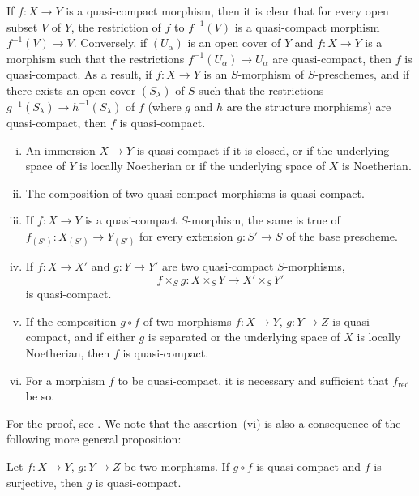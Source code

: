 If $f:X\to Y$ is a quasi-compact morphism, then it is clear that for every open subset $V$ of $Y$, the restriction of $f$ to $f^{-1}(V)$ is a quasi-compact morphism $f^{-1}(V)\to V$.
Conversely, if $(U_\alpha)$ is an open cover of $Y$ and $f:X\to Y$ is a morphism such that the restrictions $f^{-1}(U_\alpha)\to U_\alpha$ are quasi-compact, then $f$ is quasi-compact.
As
a result, if $f:X\to Y$ is an $S$-morphism of $S$-preschemes, and if there exists an open cover $(S_\lambda)$ of $S$ such that the restrictions $g^{-1}(S_\lambda)\to h^{-1}(S_\lambda)$ of $f$ (where $g$ and $h$ are the structure morphisms) are quasi-compact, then $f$ is quasi-compact.

\begin{proposition}[1.1.2]
\label{IV.1.1.2}
\medskip\noindent
\begin{enumerate}[(i)]
  \item An immersion $X\to Y$ is quasi-compact if it is closed,
    or if the underlying space of $Y$ is locally Noetherian or if the underlying space of $X$ is Noetherian.
  \item The composition of two quasi-compact morphisms is quasi-compact.
  \item If $f:X\to Y$ is a quasi-compact $S$-morphism, the same is true of $f_{(S')}:X_{(S')}\to Y_{(S')}$
    for every extension $g:S'\to S$ of the base prescheme.
  \item If $f:X\to X'$ and $g:Y\to Y'$ are two quasi-compact $S$-morphisms,
    \[
      f\times_S g: X\times_S Y \to X'\times_S Y'
    \]
    is quasi-compact.
  \item If the composition $g\circ f$ of two morphisms $f:X\to Y$, $g:Y\to Z$ is quasi-compact, and
    if either $g$ is separated or the underlying space of $X$ is locally Noetherian, then $f$ is quasi-compact.
  \item For a morphism $f$ to be quasi-compact, it is necessary and sufficient that $f_{\mathrm{red}}$ be so.
\end{enumerate}
\end{proposition}

For the proof, see .
We note that the assertion~(vi) is also a
consequence of the following more general proposition:

\begin{proposition}[1.1.3]
\label{IV.1.1.3}
Let $f:X\to Y$, $g:Y\to Z$ be two morphisms. If $g\circ f$ is quasi-compact and $f$ is surjective, then $g$ is quasi-compact.
\end{proposition}

